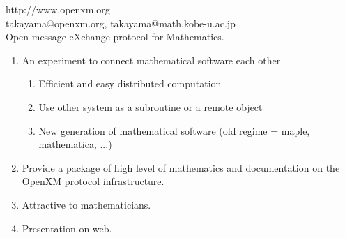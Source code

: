 \documentclass{slides}
\begin{document}
http://www.openxm.org \\
takayama@openxm.org, takayama@math.kobe-u.ac.jp \\

Open message eXchange protocol for Mathematics.

\begin{enumerate}
\item An experiment to connect mathematical software each other
\begin{enumerate}
\item Efficient and easy distributed computation
\item Use other system as a subroutine or a remote object
\item New generation of mathematical software
(old regime = maple, mathematica, ...)
\end{enumerate}
\item Provide a package of high level of mathematics and
documentation on the OpenXM protocol infrastructure.
\item Attractive to mathematicians.
\item Presentation on web.
\end{enumerate}



\newpage
\end{document}
